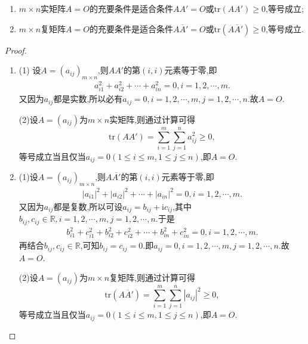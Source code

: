 \documentclass[../../main.tex]{subfiles}%
\begin{document}
\begin{proposition}[零矩阵的充要条件]\label{proposition:零矩阵的充要条件}
\begin{enumerate}
\item \(m\times n\)实矩阵\(A = O\)的充要条件是适合条件\(AA' = O\)或\(\mathrm{tr}(AA')\geqslant 0\),等号成立;

\item \(m\times n\)复矩阵\(A = O\)的充要条件是适合条件\(A\overline{A}'= O\)或\(\mathrm{tr}(A\overline{A}')\geqslant 0\),等号成立.
\end{enumerate}
\end{proposition}
\begin{proof}
\begin{enumerate}
\item (1) 设\(A=(a_{ij})_{m\times n}\),则\(AA'\)的第\((i,i)\)元素等于零,即
\begin{align*}
a_{i1}^{2}+a_{i2}^{2}+\cdots +a_{in}^{2}=0,i=1,2,\cdots,m.
\end{align*}
又因为\(a_{ij}\)都是实数,所以必有\(a_{ij}=0,i=1,2,\cdots,m,j=1,2,\cdots,n\).故$A=O$.

(2)设\(A=(a_{ij})\)为\(m\times n\)实矩阵,则通过计算可得
\[
\mathrm{tr}(AA')=\sum_{i = 1}^{m}\sum_{j = 1}^{n}a_{ij}^2\geqslant 0,
\]
等号成立当且仅当\(a_{ij}=0(1\leqslant  i\leqslant  m,1\leqslant  j\leqslant  n)\),即\(A = O\).

\item (1)设\(A=(a_{ij})_{m\times n}\),则\(A\overline{A'}\)的第\((i,i)\)元素等于零,即
\begin{align*}
\left| a_{i1} \right|^2+\left| a_{i2} \right|^2+\cdots +\left| a_{in} \right|^2=0,i=1,2,\cdots ,m.
\end{align*}
又因为\(a_{ij}\)都是复数,所以可设$a_{ij}=b_{ij}+\mathrm{i}c_{ij}$,其中$b_{ij},c_{ij}\in \mathbb{R},i=1,2,\cdots,m,j=1,2,\cdots,n$.于是
\begin{align*}
b_{i1}^{2}+c_{i1}^{2}+b_{i2}^{2}+c_{i2}^{2}+\cdots +b_{in}^{2}+c_{in}^{2}=0,i=1,2,\cdots ,m.
\end{align*}
再结合$b_{ij},c_{ij}\in \mathbb{R}$,可知\(b_{ij}=c_{ij}=0\).即\(a_{ij}=0,i=1,2,\cdots,m,j=1,2,\cdots,n\).故$A=O$.

(2)设\(A=(a_{ij})\)为\(m\times n\)复矩阵,则通过计算可得
\[
\mathrm{tr}(A\overline{A}')=\sum_{i = 1}^{m}\sum_{j = 1}^{n}|a_{ij}|^2\geqslant 0,
\]
等号成立当且仅当\(a_{ij}=0(1\leqslant  i\leqslant  m,1\leqslant  j\leqslant  n)\),即\(A = O\).
\end{enumerate}




\end{proof}
\end{document}
